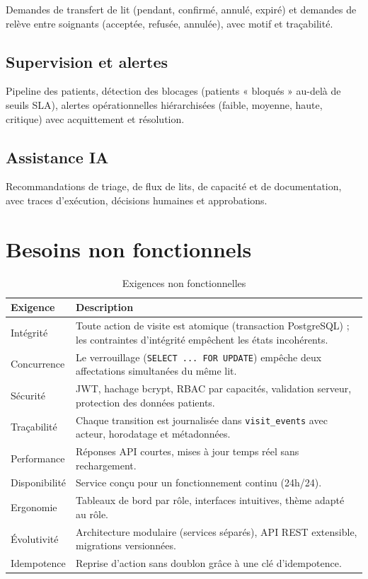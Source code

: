 Demandes de transfert de lit (pendant, confirmé, annulé, expiré) et demandes de relève entre soignants (acceptée, refusée, annulée), avec motif et traçabilité.

\subsection{Supervision et alertes}

Pipeline des patients, détection des blocages (patients « bloqués » au-delà de seuils SLA), alertes opérationnelles hiérarchisées (faible, moyenne, haute, critique) avec acquittement et résolution.

\subsection{Assistance IA}

Recommandations de triage, de flux de lits, de capacité et de documentation, avec traces d'exécution, décisions humaines et approbations.

\section{Besoins non fonctionnels}

\begin{table}[H]
\centering
\caption{Exigences non fonctionnelles}
\label{tab:bnf}
\small
\begin{tabular}{|l|p{9cm}|}
\hline
\textbf{Exigence} & \textbf{Description} \\
\hline
Intégrité & Toute action de visite est atomique (transaction PostgreSQL) ; les contraintes d'intégrité empêchent les états incohérents. \\
\hline
Concurrence & Le verrouillage (\texttt{SELECT ... FOR UPDATE}) empêche deux affectations simultanées du même lit. \\
\hline
Sécurité & JWT, hachage bcrypt, RBAC par capacités, validation serveur, protection des données patients. \\
\hline
Traçabilité & Chaque transition est journalisée dans \texttt{visit\_events} avec acteur, horodatage et métadonnées. \\
\hline
Performance & Réponses API courtes, mises à jour temps réel sans rechargement. \\
\hline
Disponibilité & Service conçu pour un fonctionnement continu (24h/24). \\
\hline
Ergonomie & Tableaux de bord par rôle, interfaces intuitives, thème adapté au rôle. \\
\hline
Évolutivité & Architecture modulaire (services séparés), API REST extensible, migrations versionnées. \\
\hline
Idempotence & Reprise d'action sans doublon grâce à une clé d'idempotence. \\
\hline
\end{tabular}
\end{table}


